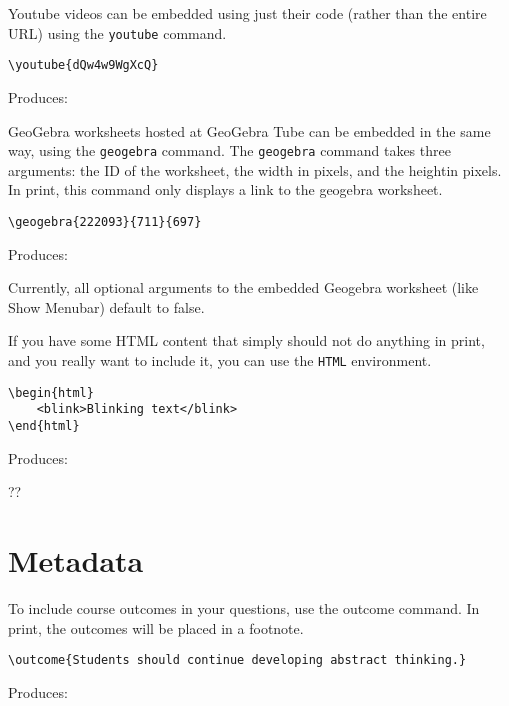 \documentclass{ximera}
\begin{document}
\begin{example} Youtube videos can be embedded using just their code (rather than the entire URL) using the \verb!youtube! command.

\begin{verbatim}
\youtube{dQw4w9WgXcQ}
\end{verbatim}

Produces:

\end{example}

\begin{example} GeoGebra worksheets hosted at GeoGebra Tube can be embedded in the same way, using the \verb!geogebra! command. The \verb!geogebra! command takes three arguments: the ID of the worksheet, the width in pixels, and the heightin pixels. In print, this command only displays a link to the geogebra worksheet.

\begin{verbatim}
\geogebra{222093}{711}{697}
\end{verbatim}

Produces: 


\begin{remark} 
  Currently, all optional arguments to the embedded Geogebra worksheet (like Show Menubar) default to false.
\end{remark}

\end{example}

\begin{example} If you have some HTML content that simply should not do anything in print, and you really want to include it, you can use the \verb!HTML! environment. 

\begin{verbatim}
\begin{html}
    <blink>Blinking text</blink> 
\end{html}
\end{verbatim}

Produces: 

??

\end{example}

\section{Metadata} \label{Metadata}

\begin{example} To include course outcomes in your questions, use the outcome command. In print, the outcomes will be placed in a footnote.

\begin{verbatim}
\outcome{Students should continue developing abstract thinking.}
\end{verbatim}

Produces:

\end{example}
\end{document}
